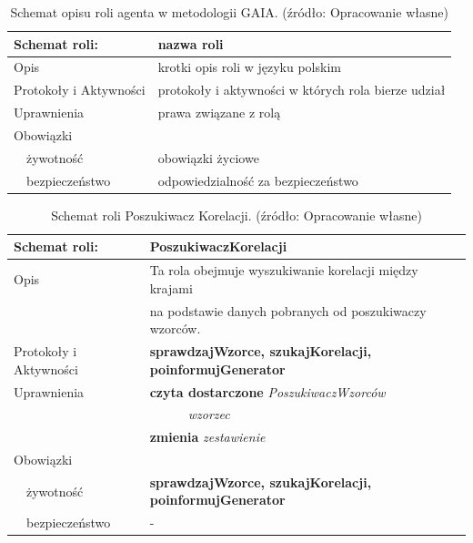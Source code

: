 \documentclass[11pt]{report}
\begin{document}
    \begin{table}[ht!]
        \begin{tabular}{ll}
            Schemat roli:          & nazwa roli                                          \\ \hline
            Opis                   & krotki opis roli w języku polskim                   \\
            Protokoły i Aktywności & protokoły i aktywności w których rola bierze udział \\
            Uprawnienia            & prawa związane z rolą                               \\
            Obowiązki              &                                                     \\
            ~~żywotność            & obowiązki życiowe                                   \\
            ~~bezpieczeństwo       & odpowiedzialność za bezpieczeństwo                  \\
        \end{tabular}
        \caption{Schemat opisu roli agenta w metodologii GAIA. (źródło: Opracowanie własne)}
        \label{tab:schemat roli}
    \end{table}

    \begin{table}[ht!]
        \begin{tabular}{ll}
            Schemat roli:          & PoszukiwaczKorelacji                                           \\ \hline
            Opis                   & Ta rola obejmuje wyszukiwanie korelacji między krajami         \\
            & na podstawie danych pobranych od poszukiwaczy wzorców.         \\
            Protokoły i Aktywności & \textbf{sprawdzajWzorce, szukajKorelacji, poinformujGenerator} \\
            Uprawnienia            & \textbf{czyta dostarczone} \textit{PoszukiwaczWzorców}         \\
            & ~~~~~~\textit{wzorzec}                                         \\
            & \textbf{zmienia} \textit{zestawienie}                          \\
            Obowiązki              &                                                                \\
            ~~żywotność            & \textbf{sprawdzajWzorce, szukajKorelacji, poinformujGenerator} \\
            ~~bezpieczeństwo       & -                                                              \\
        \end{tabular}
        \caption{Schemat roli Poszukiwacz Korelacji. (źródło: Opracowanie własne)}
        \label{tab:schemat roli poszukiwacz korelacji}
    \end{table}
\end{document}
